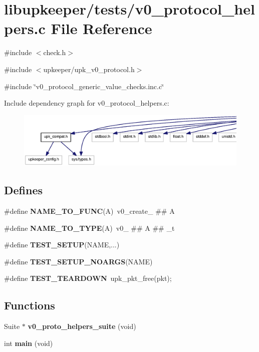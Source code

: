 \section{libupkeeper/tests/v0\_\-protocol\_\-helpers.c File Reference}
\label{v0__protocol__helpers_8c}
{\ttfamily \#include $<$check.h$>$}\par
{\ttfamily \#include $<$upkeeper/upk\_\-v0\_\-protocol.h$>$}\par
{\ttfamily \#include \char`\"{}v0\_\-protocol\_\-generic\_\-value\_\-checks.inc.c\char`\"{}}\par
Include dependency graph for v0\_\-protocol\_\-helpers.c:\nopagebreak
\begin{figure}[H]
\begin{center}
\leavevmode
\includegraphics[width=400pt]{v0__protocol__helpers_8c__incl}
\end{center}
\end{figure}
\subsection*{Defines}
\begin{DoxyCompactItemize}
\item 
\#define {\bf NAME\_\-TO\_\-FUNC}(A)~v0\_\-create\_\- \#\# A
\item 
\#define {\bf NAME\_\-TO\_\-TYPE}(A)~v0\_\- \#\# A \#\# \_\-t
\item 
\#define {\bf TEST\_\-SETUP}(NAME,...)
\item 
\#define {\bf TEST\_\-SETUP\_\-NOARGS}(NAME)
\item 
\#define {\bf TEST\_\-TEARDOWN}~upk\_\-pkt\_\-free(pkt);
\end{DoxyCompactItemize}
\subsection*{Functions}
\begin{DoxyCompactItemize}
\item 
Suite $\ast$ {\bf v0\_\-proto\_\-helpers\_\-suite} (void)
\item 
int {\bf main} (void)
\end{DoxyCompactItemize}


